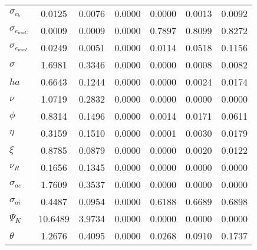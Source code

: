 \begin{center}
\begin{longtable}{lcccccc}
$ \sigma_{{e_b}}       $	 & 	          0.0125	 & 	          0.0076	 & 	          0.0000	 & 	          0.0000	 & 	          0.0013	 & 	          0.0092 \\ 
$ \sigma_{{e_{muC}}}   $	 & 	          0.0009	 & 	          0.0009	 & 	          0.0000	 & 	          0.7897	 & 	          0.8099	 & 	          0.8272 \\ 
$ \sigma_{{e_{muI}}}   $	 & 	          0.0249	 & 	          0.0051	 & 	          0.0000	 & 	          0.0114	 & 	          0.0518	 & 	          0.1156 \\ 
$ {\sigma}             $	 & 	          1.6981	 & 	          0.3346	 & 	          0.0000	 & 	          0.0000	 & 	          0.0008	 & 	          0.0082 \\ 
$ {ha}                 $	 & 	          0.6643	 & 	          0.1244	 & 	          0.0000	 & 	          0.0000	 & 	          0.0024	 & 	          0.0174 \\ 
$ \nu                  $	 & 	          1.0719	 & 	          0.2832	 & 	          0.0000	 & 	          0.0000	 & 	          0.0000	 & 	          0.0000 \\ 
$ {\phi}               $	 & 	          0.8314	 & 	          0.1496	 & 	          0.0000	 & 	          0.0014	 & 	          0.0171	 & 	          0.0611 \\ 
$ {\eta}               $	 & 	          0.3159	 & 	          0.1510	 & 	          0.0000	 & 	          0.0001	 & 	          0.0030	 & 	          0.0179 \\ 
$ \xi                  $	 & 	          0.8785	 & 	          0.0879	 & 	          0.0000	 & 	          0.0000	 & 	          0.0020	 & 	          0.0122 \\ 
$ {\nu_R}              $	 & 	          0.1656	 & 	          0.1345	 & 	          0.0000	 & 	          0.0000	 & 	          0.0000	 & 	          0.0000 \\ 
$ {\sigma_{ac}}        $	 & 	          1.7609	 & 	          0.3537	 & 	          0.0000	 & 	          0.0000	 & 	          0.0000	 & 	          0.0000 \\ 
$ {\sigma_{ai}}        $	 & 	          0.4487	 & 	          0.0954	 & 	          0.0000	 & 	          0.6188	 & 	          0.6689	 & 	          0.6898 \\ 
$ {\Psi_{K}}           $	 & 	         10.6489	 & 	          3.9734	 & 	          0.0000	 & 	          0.0000	 & 	          0.0000	 & 	          0.0000 \\ 
$ {\theta}             $	 & 	          1.2676	 & 	          0.4095	 & 	          0.0000	 & 	          0.0268	 & 	          0.0910	 & 	          0.1737 \\ 

\end{longtable}
\end{center}
